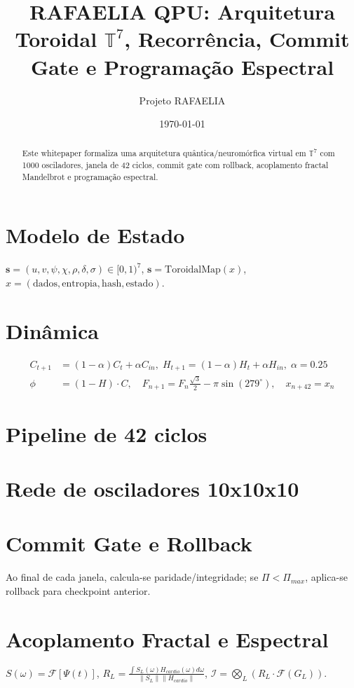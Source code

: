 \documentclass[11pt]{article}
\title{RAFAELIA QPU: Arquitetura Toroidal $\mathbb{T}^7$, Recorrência, Commit Gate e Programação Espectral}
\author{Projeto RAFAELIA}
\date{\today}
\begin{document}
\maketitle
\begin{abstract}
Este whitepaper formaliza uma arquitetura quântica/neuromórfica virtual em $\mathbb{T}^7$ com 1000 osciladores, janela de 42 ciclos, commit gate com rollback, acoplamento fractal Mandelbrot e programação espectral.
\end{abstract}
\section{Modelo de Estado}
$\mathbf{s}=(u,v,\psi,\chi,\rho,\delta,\sigma)\in [0,1)^7$, $\mathbf{s}=\mathrm{ToroidalMap}(x)$, $x=(\text{dados},\text{entropia},\text{hash},\text{estado})$.
\section{Dinâmica}
\begin{align}
C_{t+1}&=(1-\alpha)C_t+\alpha C_{in},\; H_{t+1}=(1-\alpha)H_t+\alpha H_{in},\;\alpha=0.25\\
\phi&=(1-H)\cdot C,\quad F_{n+1}=F_n\frac{\sqrt3}{2}-\pi\sin(279^\circ),\quad x_{n+42}=x_n
\end{align}
\section{Pipeline de 42 ciclos}
\begin{center}
\end{center}
\section{Rede de osciladores 10x10x10}
\begin{center}
\end{center}
\section{Commit Gate e Rollback}
Ao final de cada janela, calcula-se paridade/integridade; se $\Pi<\Pi_{max}$, aplica-se rollback para checkpoint anterior.
\section{Acoplamento Fractal e Espectral}
$S(\omega)=\mathcal{F}[\Psi(t)]$, 
$R_L=\frac{\int S_L(\omega)H_{cardio}(\omega)d\omega}{\|S_L\|\|H_{cardio}\|}$,
$\mathcal{I}=\bigotimes_L (R_L\cdot\mathcal{F}(G_L))$.
\end{document}
